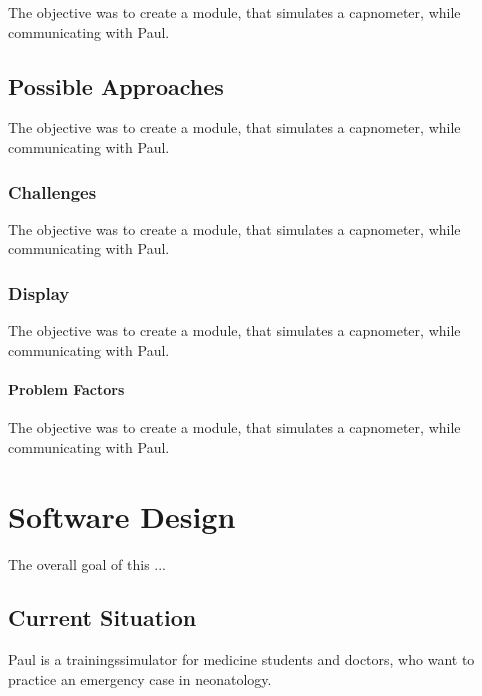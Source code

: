 \documentclass[12pt]{article}
\begin{document}
The objective was to create a module, that simulates a capnometer, while communicating
with Paul.


\subsection{Possible Approaches}

The objective was to create a module, that simulates a capnometer, while communicating
with Paul.


\subsubsection{Challenges}

The objective was to create a module, that simulates a capnometer, while communicating
with Paul.


\subsubsection{Display}

The objective was to create a module, that simulates a capnometer, while communicating
with Paul.


\paragraph{Problem Factors}

The objective was to create a module, that simulates a capnometer, while communicating
with Paul.


\clearpage


\section{Software Design}

The overall goal of this ...


\subsection{Current Situation}

Paul is a trainingssimulator for medicine students and doctors, who want to practice
an emergency case in neonatology.
\end{document}
